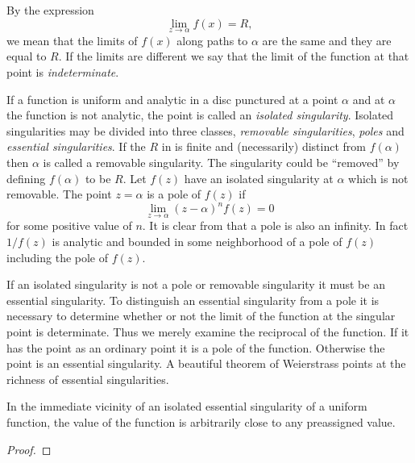 By the expression 
\begin{equation}
\lim_{z \rightarrow \alpha} f(x) = R,
\label{Limit:Def:Eq}
\end{equation}
we mean that the limits of $f(x)$ along paths to $\alpha$ are the same 
and they are equal to $R$.  If the limits are different we say that
the limit of the function at that point is {\em indeterminate\/}.

If a function is uniform and analytic in a disc punctured at a
point $\alpha$ and at $\alpha$ the function is not analytic, the point is 
called an {\em isolated singularity\/}.  Isolated singularities may be 
divided into three classes, {\em removable singularities\/}, {\em poles} and
{\em essential singularities\/}.  If the $R$ in 
is finite and 
(necessarily) distinct from $f(\alpha)$ then $\alpha$ is called a removable
singularity.  The singularity could be ``removed'' by defining $f(\alpha)$
to be $R$.  Let $f(z)$ have an isolated singularity at $\alpha$ which 
is not removable.  The point $z = \alpha$ is a pole of $f(z)$ if 
\begin{equation}
\lim _{z \rightarrow \alpha} (z - \alpha)^n f(z) = 0 
\label{Pole:Def:Eq}
\end{equation}
for some positive value of $n$.  It is clear from 
that a pole is also an infinity.  In fact $1/f(z)$ is analytic and
bounded in some neighborhood of a pole of $f(z)$ including the pole of
$f(z)$.

If an isolated singularity is not a pole or removable singularity it
must be an essential singularity.  To distinguish an essential
singularity from a pole it is necessary to determine whether or not
the limit of the function at the singular point is determinate.  Thus
we merely examine the reciprocal of the function.  If it has the point
as an ordinary point it is a pole of the function.  Otherwise the
point is an essential singularity.  A beautiful theorem of Weierstrass
points at the richness of essential singularities.

\begin{proposition}[Weierstrass]
In the immediate vicinity of an isolated essential singularity of a
uniform function, the value of the function is arbitrarily close to
any preassigned value.
\end{proposition}

\begin{proof} 
\end{proof}

